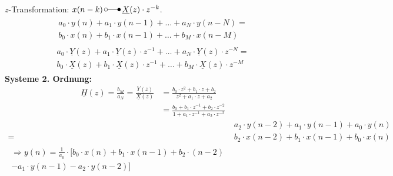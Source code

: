 $z$-Transformation: $x(n-k) \, \laplace \, \underline{X}(z)\cdot z^{-k}  $.
\begin{align*}
	\begin{split}
		a_{0} \cdot y(n)+a_{1} \cdot y(n-1)+\ldots+a_{N} \cdot y(n-N)=\\
		b_{0} \cdot x(n)+b_{1}  \cdot x(n-1)+\ldots+b_{M} \cdot x(n-M)
	\end{split}
\end{align*}
\begin{align*}
	\begin{split}
		a_{0} \cdot \underline{Y}(z)+a_{1} \cdot \underline{Y}(z)\cdot z^{-1}+\ldots+a_{N} \cdot \underline{Y}(z)\cdot z^{-N}=\\
		b_{0} \cdot \underline{X}(z)+b_{1}  \cdot \underline{X}(z)\cdot z^{-1}+\ldots+b_{M} \cdot \underline{X}(z)\cdot z^{-M}
	\end{split}
\end{align*}
\textbf{Systeme 2. Ordnung:}
\begin{align*}
			\underline{H}(z)  =  \frac{b_M}{a_N}=\frac{\underline{Y}(z)}{\underline{X}(z)} &= \frac{b_0 \cdot z^{2} + b_1 \cdot z + b_2}{z^{2}+a_1 \cdot z + a_2}\\
			 &= \frac{b_0 + b_1 \cdot z^{-1} + b_2 \cdot z^{-2}}{1 + a_1 \cdot z^{-1} + a_2 \cdot  z^{-2}}
\end{align*}
\begin{align*}
		 & a_2 \cdot y(n-2) + a_1 \cdot y(n-1) + a_0 \cdot y(n)\\ 
		 =\, & b_2 \cdot x(n-2) + b_1 \cdot x(n-1) + b_0 \cdot x(n)\\
		 \begin{split}
		 \Rightarrow y(n) = \frac{1}{a_0} \cdot [ b_0 \cdot x(n) + b_1 \cdot x(n-1) + b_2 \cdot (n-2) \\ - a_1 \cdot y(n-1) - a_2 \cdot y(n-2)]
		 \end{split}
\end{align*}

